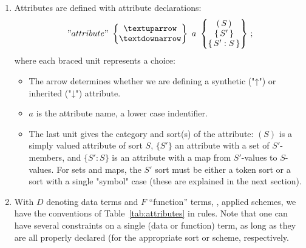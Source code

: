\documentclass[11pt]{article} %
\begin{document}
\begin{notation}[attributes]\leavevmode
  \begin{enumerate}

  \item Attributes are defined with attribute declarations:
    \begin{displaymath}
      "attribute"
      ~
      \left\{
      \begin{matrix}
        {↑} \\
        {↓}
      \end{matrix}
      \right\}
      ~
      a
      ~
      \left\{
      \begin{matrix}
        (\,S\,) \\
        \{\,S'\,\} \\
        \{\,S' : S\,\}
      \end{matrix}
      \right\}
      \,;
    \end{displaymath}
    where each braced unit represents a choice:
    \begin{itemize}
    \item The arrow determines whether we are defining a synthetic ("↑") or inherited ("↓")
      attribute.
    \item $a$ is the attribute name, a lower case indentifier.
    \item The last unit gives the category and sort(s) of the attribute: $(S)$ is a simply valued
      attribute of sort $S$, $\{S'\}$ an attribute with a set of $S'$-members, and $\{S':S\}$ is an
      attribute with a map from $S'$-values to $S$-values. For sets and maps, the $S'$ sort must be
      either a token sort or a sort with a single "symbol" case (these are explained in the next
      section).
    \end{itemize}

  \item With $D$ denoting data terms and $F$ ``function'' terms, \ie, applied schemes, we have the
    conventions of Table~\ref{tab:attributes} in \HAX rules.  Note that one can have several
    constraints on a single (data or function) term, as long as they are all properly declared (for
    the appropriate sort or scheme, respectively.

  \end{enumerate}
\end{notation}
\end{document}
